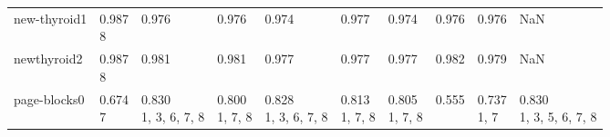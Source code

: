 \begin{tabular}{llllllllll}
new-thyroid1           &     \makecell{0.987 \\ \scriptsize{8}} &               \makecell{0.976 \\ \scriptsize{}} &         \makecell{0.976 \\ \scriptsize{}} &               \makecell{0.974 \\ \scriptsize{}} &            \makecell{0.977 \\ \scriptsize{}} &               \makecell{0.974 \\ \scriptsize{}} &                     \makecell{0.976 \\ \scriptsize{}} &               \makecell{0.976 \\ \scriptsize{}} &                                                NaN \\
newthyroid2            &     \makecell{0.987 \\ \scriptsize{8}} &               \makecell{0.981 \\ \scriptsize{}} &         \makecell{0.981 \\ \scriptsize{}} &               \makecell{0.977 \\ \scriptsize{}} &            \makecell{0.977 \\ \scriptsize{}} &               \makecell{0.977 \\ \scriptsize{}} &                     \makecell{0.982 \\ \scriptsize{}} &               \makecell{0.979 \\ \scriptsize{}} &                                                NaN \\
page-blocks0           &     \makecell{0.674 \\ \scriptsize{7}} &  \makecell{0.830 \\ \scriptsize{1, 3, 6, 7, 8}} &  \makecell{0.800 \\ \scriptsize{1, 7, 8}} &  \makecell{0.828 \\ \scriptsize{1, 3, 6, 7, 8}} &     \makecell{0.813 \\ \scriptsize{1, 7, 8}} &        \makecell{0.805 \\ \scriptsize{1, 7, 8}} &                     \makecell{0.555 \\ \scriptsize{}} &           \makecell{0.737 \\ \scriptsize{1, 7}} &  \makecell{0.830 \\ \scriptsize{1, 3, 5, 6, 7, 8}} \\

\end{tabular}
